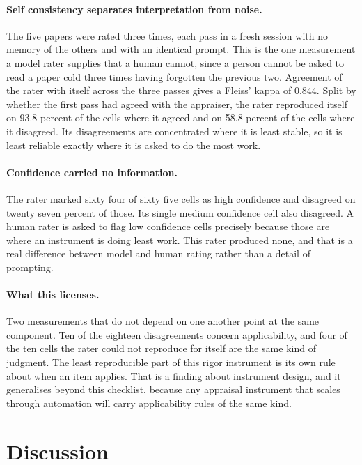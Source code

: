 \documentclass{article}
\begin{document}
\paragraph{Self consistency separates interpretation from noise.} The five papers were rated three
times, each pass in a fresh session with no memory of the others and with an identical prompt. This
is the one measurement a model rater supplies that a human cannot, since a person cannot be asked to
read a paper cold three times having forgotten the previous two. Agreement of the rater with itself
across the three passes gives a Fleiss' kappa of 0.844. Split by whether the first pass had agreed
with the appraiser, the rater reproduced itself on 93.8 percent of the cells where it agreed and on
58.8 percent of the cells where it disagreed. Its disagreements are concentrated where it is least
stable, so it is least reliable exactly where it is asked to do the most work.

\paragraph{Confidence carried no information.} The rater marked sixty four of sixty five cells as
high confidence and disagreed on twenty seven percent of those. Its single medium confidence cell
also disagreed. A human rater is asked to flag low confidence cells precisely because those are
where an instrument is doing least work. This rater produced none, and that is a real difference
between model and human rating rather than a detail of prompting.

\paragraph{What this licenses.} Two measurements that do not depend on one another point at the same
component. Ten of the eighteen disagreements concern applicability, and four of the ten cells the
rater could not reproduce for itself are the same kind of judgment. The least reproducible part of
this rigor instrument is its own rule about when an item applies. That is a finding about
instrument design, and it generalises beyond this checklist, because any appraisal instrument that
scales through automation will carry applicability rules of the same kind.

\section{Discussion}
\label{sec:discussion}
\end{document}
